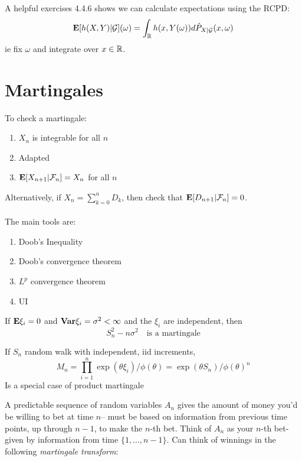 \documentclass{article}
\begin{document}
A helpful exercises 4.4.6 shows we can calculate expectations using the RCPD:
$$\mathbf{E} [h(X,Y)|\mathcal G](\omega) = \int_\mathbb R h(x, Y(\omega)) d\hat P_{X|\mathcal G}(x,\omega)$$
ie fix $\omega$ and integrate over $x\in \mathbb R$. 

\section{Martingales}

To check a martingale:
\begin{enumerate}
	\item $X_n$ is integrable for all $n$
	\item Adapted
	\item $\mathbf{E}[X_{n+1} |\mathcal F_n] = X_n$ for all $n$
\end{enumerate}

Alternatively, if $X_n = \sum_{k=0}^n D_k$, then check that $\mathbf{E}[D_{n+1}|\mathcal F_n] = 0$. \\\\

The main tools are:
\begin{enumerate}
	\item Doob's Inequality
	\item Doob's convergence theorem
	\item $L^p$ convergence theorem
	\item UI
\end{enumerate}

\begin{example}
If $\mathbf{E} \xi_i = 0$ and $\mathbf{Var} \xi_i =\sigma^2 <\infty $ and the $\xi_i$ are independent, then
$$S_n^2 - n\sigma^2 \quad \text{is a martingale}$$
\end{example}

\begin{example}
If $S_n$ random walk with independent, iid increments, 
$$M_n = \prod_{i=1}^n \exp(\theta \xi_i)/\phi(\theta) = \exp(\theta S_n)/\phi(\theta)^n$$
Is a special case of product martingale 
\end{example}



A predictable sequence of random variables $A_n$ gives the amount of money you'd be willing to bet at time $n$-- must be based on information from previous time points, up through $n-1$, to make the $n$-th bet. Think of $A_n$ as your $n$-th bet- given by information from time $\{1,\ldots ,n-1\}$. Can think of winnings in the following \textit{martingale transform}:
\end{document}
